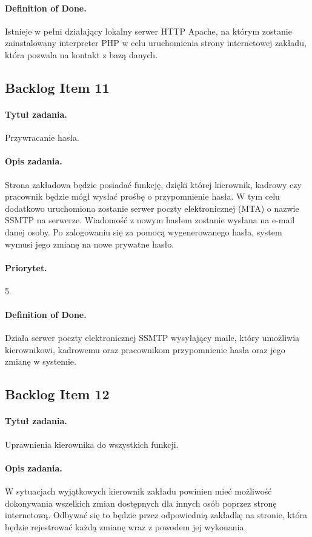 \documentclass[a4paper]{article}
\begin{document}
\paragraph{Definition of Done.} Istnieje w pełni działający lokalny serwer HTTP Apache, na którym zostanie zainstalowany interpreter PHP w celu uruchomienia strony internetowej zakładu, która pozwala na kontakt z bazą danych.

\subsection{Backlog Item 11}
\paragraph{Tytuł zadania.} Przywracanie hasła.
\paragraph{Opis zadania.} Strona zakładowa będzie posiadać funkcję, dzięki której kierownik, kadrowy czy pracownik będzie mógł wysłać prośbę o przypomnienie hasła. W tym celu dodatkowo uruchomiona zostanie serwer poczty elektronicznej (MTA) o nazwie SSMTP na serwerze. Wiadomość z nowym hasłem zostanie wysłana na e-mail danej osoby. Po zalogowaniu się za pomocą wygenerowanego hasła, system wymusi jego zmianę na nowe prywatne hasło.
\paragraph{Priorytet.} 5.
\paragraph{Definition of Done.} Działa serwer poczty elektronicznej SSMTP wysyłający maile, który umożliwia kierownikowi, kadrowemu oraz pracownikom przypomnienie hasła oraz jego zmianę w systemie.

\subsection{Backlog Item 12}
\paragraph{Tytuł zadania.} Uprawnienia kierownika do wszystkich funkcji.
\paragraph{Opis zadania.} W sytuacjach wyjątkowych kierownik zakładu powinien mieć możliwość dokonywania wszelkich zmian dostępnych dla innych osób poprzez stronę internetową. Odbywać się to będzie przez odpowiednią zakładkę na stronie, która będzie rejestrować każdą zmianę wraz z powodem jej wykonania.
\end{document}
